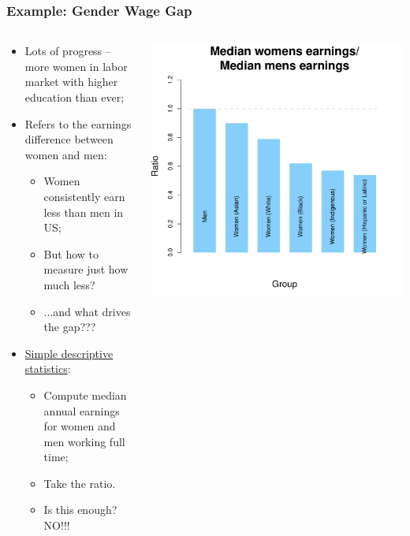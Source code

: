 \documentclass[aspectratio=169]{beamer}
\theoremstyle{principle}
\begin{document}
\begin{frame}
\frametitle{Example: Gender Wage Gap}

\begin{columns}
\begin{column}{0.5\textwidth}

\begin{itemize}
\item Lots of progress -- more women in labor market with higher education than ever;
\bigskip
\item Refers to the earnings difference between women and men:
\begin{itemize}
\item Women consistently earn less than men in US;
\item But how to measure just how much less?
\item ...and what drives the gap???
\end{itemize}
\bigskip
\item \href{https://www.americanprogress.org/article/quick-facts-gender-wage-gap/}{Simple descriptive statistics}:
\begin{itemize}
\item Compute median annual earnings for women and men working full time;
\item Take the ratio.
\item Is this enough?  NO!!!
\end{itemize}
\end{itemize}

\end{column}
\begin{column}{0.5\textwidth}
\includegraphics[scale=0.4]{gender_wage_gap_DA.pdf}
\end{column}
\end{columns}

\end{frame}
\end{document}
